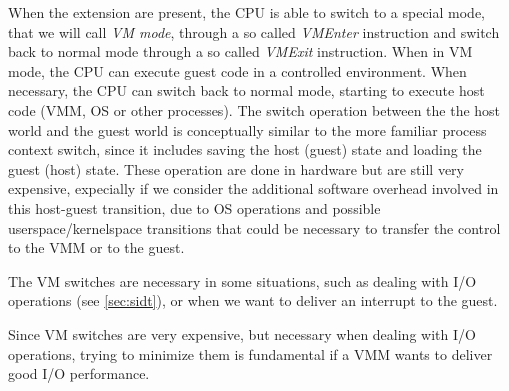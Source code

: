 When the extension are present, the CPU is able to switch to a special mode, that we will call \emph{VM mode}, through a so called
\emph{VMEnter} instruction and switch back to normal mode through a so called \emph{VMExit} instruction.
When in VM mode, the CPU can execute guest code in a controlled environment. When necessary, the CPU can switch back to normal mode, 
starting to execute host code (VMM, OS or other processes).
The switch operation between the the host world and the guest world is conceptually similar to the more familiar process context switch,
since it includes saving the host (guest) state and loading the guest (host) state. These operation are done in hardware but are
still very expensive, expecially if we consider the additional software overhead involved in this host-guest transition, due to
OS operations and possible userspace/kernelspace transitions that could be necessary to transfer the control to the VMM or to the
guest.

The VM switches are necessary in some situations, such as dealing with I/O operations (see \ref{sec:sidt}), or when we want
to deliver an interrupt to the guest.

Since VM switches are very expensive, but necessary when dealing with I/O operations, trying to minimize them is fundamental if a VMM
wants to deliver good I/O performance.
